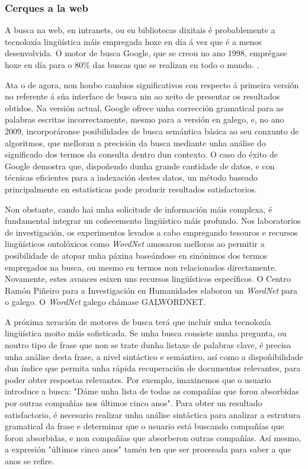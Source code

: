 \begin{multicols}{2}
\subsubsection{Cerques a la web}

  A busca na web, en intranets, ou en bibliotecas dixitais é probablemente a tecnoloxía lingüística máis empregada hoxe en día á vez que é a menos desenvolvida. O motor de busca Google, que se creou no ano 1998, emprégase hoxe en día para o 80\% das buscas que se realizan en todo o mundo. \cite{CAT-Nota22}. 

Ata o de agora, non houbo cambios significativos con respecto á primeira versión no referente á súa interface de busca nin ao xeito de presentar os resultados obtidos. Na versión actual, Google ofrece unha corrección gramatical para as palabras escritas incorrectamente, mesmo para a versión en galego, e, no ano 2009, incorporáronse posibilidades de busca semántica básica ao seu conxunto de algoritmos\cite{CAT-Nota23}, que melloran a precisión da busca mediante unha análise do significado dos termos da consulta dentro dun contexto. O caso do éxito de Google demostra que, dispoñendo dunha grande cantidade de datos, e con técnicas eficientes para a indexación destes datos, un método baseado principalmente en estatísticas pode producir resultados satisfactorios. 

Non obstante, cando hai unha solicitude de información máis complexa, é fundamental integrar un coñecemento lingüístico máis profundo. Nos laboratorios de investigación, os experimentos levados a cabo empregando tesouros e recursos lingüísticos ontolóxicos como \textit{WordNet} amosaron melloras ao permitir a posibilidade de atopar unha páxina baseándose en sinónimos dos termos empregados na busca, ou mesmo en termos non relacionados directamente. Novamente, estes avances esixen uns recursos lingüísticos específicos. O Centro Ramón Piñeiro para a Investigación en Humanidades\cite{GAL-Nota24} elaborou un \textit{WordNet} para o galego. O \textit{WordNet} galego chámase GALWORDNET.

A próxima xeración de motores de busca terá que incluír unha tecnoloxía lingüística moito máis sofisticada. Se unha busca consiste nunha pregunta, ou noutro tipo de frase que non se trate dunha listaxe de palabras clave, é precisa unha análise desta frase, a nivel sintáctico e semántico, así como a dispoñibilidade dun índice que permita unha rápida recuperación de documentos relevantes, para poder obter respostas relevantes. Por exemplo, imaxinemos que o usuario introduce a busca: "Dáme unha lista de todas as compañías que foron absorbidas por outras compañías nos últimos cinco anos". Para obter un resultado satisfactorio, é necesario realizar unha análise sintáctica para analizar a estrutura gramatical da frase e determinar que o usuario está buscando compañías que foron absorbidas, e non compañías que absorberon outras compañías. Así mesmo, a expresión "últimos cinco anos" tamén ten que ser procesada para saber a que anos se refire. 



\end{multicols}
